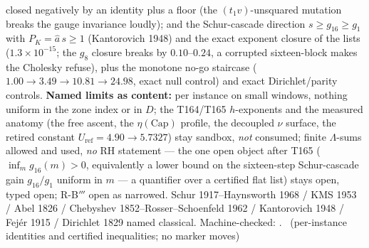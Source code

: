 closed negatively by an identity plus a floor (the $(t_1v)$-unsquared
mutation breaks the gauge invariance loudly); and the Schur-cascade
direction $s\ge g_{16}\ge g_1$ with $P_K=\hat a\,s\ge1$ (Kantorovich
1948) and the exact exponent closure of the lists
($1.3\times10^{-15}$; the $g_8$ closure breaks by $0.10$--$0.24$, a
corrupted sixteen-block makes the Cholesky refuse), plus the monotone
no-go staircase ($1.00\to3.49\to10.81\to24.98$, exact null control) and
exact Dirichlet/parity controls.
\textbf{Named limits as content:} per instance on small windows,
nothing uniform in the zone index or in $D$; the T164/T165
$h$-exponents and the measured anatomy (the free ascent, the
$\eta(\mathrm{Cap})$ profile, the decoupled $\nu$ surface, the retired
constant $U_{\mathrm{ref}}=4.90\to5.7327$) stay sandbox, \emph{not}
consumed; finite $\Lambda$-sums allowed and used, \emph{no} RH
statement --- the one open object after T165 ($\inf_m g_{16}(m)>0$,
equivalently a lower bound on the sixteen-step Schur-cascade gain
$g_{16}/g_1$ uniform in $m$ --- a quantifier over a certified flat
list) stays open, typed open; R-B$'''$ open as narrowed.
Schur 1917--Haynsworth 1968 / KMS 1953 / Abel 1826 / Chebyshev
1852--Rosser--Schoenfeld 1962 / Kantorovich 1948 / Fej\'er 1915 /
Dirichlet 1829 named classical. Machine-checked:
.
\mE\ (per-instance identities and certified inequalities; no marker moves)
\par\smallskip


